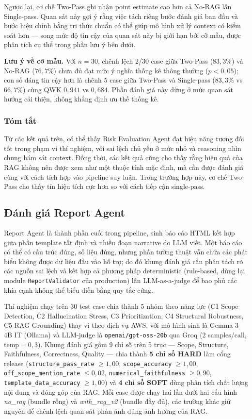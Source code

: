 Ngược lại, cơ chế Two-Pass ghi nhận point estimate cao hơn cả No-RAG lẫn Single-pass. Quan sát này gợi ý rằng việc tách riêng bước đánh giá ban đầu và bước hiệu chỉnh bằng tri thức chuẩn có thể giúp mô hình xử lý context có kiểm soát hơn --- song mức độ tin cậy của quan sát này bị giới hạn bởi cỡ mẫu, được phân tích cụ thể trong phần lưu ý bên dưới.

\textbf{Lưu ý về cỡ mẫu.} Với $n=30$, chênh lệch 2/30 case giữa Two-Pass ($83{,}3\%$) và No-RAG ($76{,}7\%$) chưa đủ đạt mức ý nghĩa thống kê thông thường ($p<0{,}05$); con số đáng tin cậy hơn là chênh 5 case giữa Two-Pass và Single-pass ($83{,}3\%$ vs $66{,}7\%$) cùng QWK $0{,}941$ vs $0{,}684$. Phần đánh giá này dừng ở mức quan sát hướng cải thiện, không khẳng định ưu thế thống kê.

\subsubsection*{Tóm tắt}

Từ các kết quả trên, có thể thấy Risk Evaluation Agent đạt hiệu năng tương đối tốt trong phạm vi thí nghiệm, với sai lệch chủ yếu ở mức nhỏ và reasoning nhìn chung bám sát context. Đồng thời, các kết quả cũng cho thấy rằng hiệu quả của RAG không nên được xem như một thuộc tính mặc định, mà cần được đánh giá cùng với cách tích hợp vào pipeline suy luận. Trong trường hợp này, cơ chế Two-Pass cho thấy tín hiệu tích cực hơn so với cách tiếp cận single-pass.


\subsection{Đánh giá Report Agent}

Report Agent là thành phần cuối trong pipeline, sinh báo cáo HTML kết hợp giữa phần template tất định và nhiều đoạn narrative do LLM viết. Một báo cáo có thể có cấu trúc đúng, số liệu đúng, nhưng phần tường thuật vẫn chứa các phát biểu không được dữ liệu đầu vào hỗ trợ; do đó khung đánh giá cần phân tách rõ các nguồn sai lệch và kết hợp cả phương pháp deterministic (rule-based, dùng lại module \texttt{ReportValidator} của production) lẫn LLM-as-a-judge để bao phủ các khía cạnh không thể biểu diễn bằng quy tắc cứng.

Thí nghiệm chạy trên 30 test case chia thành 5 nhóm theo năng lực (C1 Scope Detection, C2 Hallucination Stress, C3 Prioritization, C4 Structural Robustness, C5 RAG Grounding) thay vì theo dịch vụ AWS, với mô hình sinh là Gemma 3 4B IT (Ollama) và LLM-judge là \texttt{openai/gpt-oss-20b} qua Groq (2 samples/call, $\text{temp}=0{,}3$). Khung đánh giá gồm 9 chỉ số trên 5 trục --- Scope, Structure, Faithfulness, Correctness, Quality --- chia thành \textbf{5 chỉ số HARD} làm cổng release (\texttt{structure\_pass\_rate} $\geq 1{,}00$, \texttt{scope\_accuracy} $\geq 1{,}00$, \texttt{off\_scope\_mention\_rate} $\leq 0{,}02$, \texttt{numerical\_faithfulness} $\geq 0{,}90$, \texttt{template\_data\_accuracy} $\geq 1{,}00$) và \textbf{4 chỉ số SOFT} dùng phân tích chất lượng nội dung và đóng góp của RAG. Mỗi case được chạy hai lần dưới hai cấu hình \emph{no\_rag} (bundle rỗng) và \emph{with\_rag\_v2} (bundle đầy đủ), các trường khác giữ nguyên để chênh lệch quan sát phản ánh đúng ảnh hưởng của RAG.

